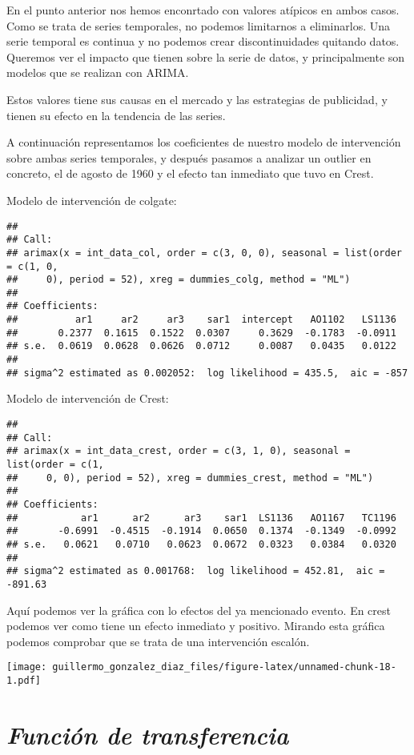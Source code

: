 \documentclass[
]{article}
\begin{document}
En el punto anterior nos hemos enconrtado con valores atípicos en ambos
casos. Como se trata de series temporales, no podemos limitarnos a
eliminarlos. Una serie temporal es continua y no podemos crear
discontinuidades quitando datos. Queremos ver el impacto que tienen
sobre la serie de datos, y principalmente son modelos que se realizan
con ARIMA.

Estos valores tiene sus causas en el mercado y las estrategias de
publicidad, y tienen su efecto en la tendencia de las series.

A continuación representamos los coeficientes de nuestro modelo de
intervención sobre ambas series temporales, y después pasamos a analizar
un outlier en concreto, el de agosto de 1960 y el efecto tan inmediato
que tuvo en Crest.

Modelo de intervención de colgate:

\begin{verbatim}
## 
## Call:
## arimax(x = int_data_col, order = c(3, 0, 0), seasonal = list(order = c(1, 0, 
##     0), period = 52), xreg = dummies_colg, method = "ML")
## 
## Coefficients:
##          ar1     ar2     ar3    sar1  intercept   AO1102   LS1136
##       0.2377  0.1615  0.1522  0.0307     0.3629  -0.1783  -0.0911
## s.e.  0.0619  0.0628  0.0626  0.0712     0.0087   0.0435   0.0122
## 
## sigma^2 estimated as 0.002052:  log likelihood = 435.5,  aic = -857
\end{verbatim}

Modelo de intervención de Crest:

\begin{verbatim}
## 
## Call:
## arimax(x = int_data_crest, order = c(3, 1, 0), seasonal = list(order = c(1, 
##     0, 0), period = 52), xreg = dummies_crest, method = "ML")
## 
## Coefficients:
##           ar1      ar2      ar3    sar1  LS1136   AO1167   TC1196
##       -0.6991  -0.4515  -0.1914  0.0650  0.1374  -0.1349  -0.0992
## s.e.   0.0621   0.0710   0.0623  0.0672  0.0323   0.0384   0.0320
## 
## sigma^2 estimated as 0.001768:  log likelihood = 452.81,  aic = -891.63
\end{verbatim}

Aquí podemos ver la gráfica con lo efectos del ya mencionado evento. En
crest podemos ver como tiene un efecto inmediato y positivo. Mirando
esta gráfica podemos comprobar que se trata de una intervención escalón.

\texttt{[image: guillermo\_gonzalez\_diaz\_files/figure-latex/unnamed-chunk-18-1.pdf]}

\hypertarget{funciuxf3n-de-transferencia}{%
\section{\texorpdfstring{\emph{Función de
transferencia}}{Función de transferencia}}\label{funciuxf3n-de-transferencia}}
\end{document}
